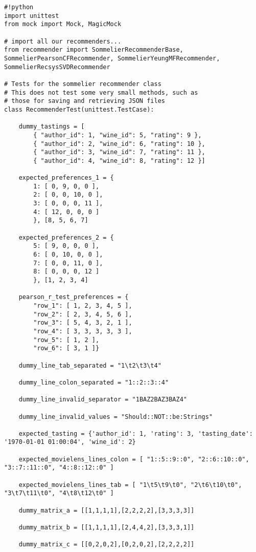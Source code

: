 \begin{verbatim}
#!python
import unittest
from mock import Mock, MagicMock

# import all our recommenders...
from recommender import SommelierRecommenderBase, SommelierPearsonCFRecommender, SommelierYeungMFRecommender, SommelierRecsysSVDRecommender

# Tests for the sommelier recommender class
# This does not test some very small methods, such as
# those for saving and retrieving JSON files
class RecommenderTest(unittest.TestCase):

    dummy_tastings = [
        { "author_id": 1, "wine_id": 5, "rating": 9 },
        { "author_id": 2, "wine_id": 6, "rating": 10 },
        { "author_id": 3, "wine_id": 7, "rating": 11 },
        { "author_id": 4, "wine_id": 8, "rating": 12 }]

    expected_preferences_1 = {
        1: [ 0, 9, 0, 0 ],
        2: [ 0, 0, 10, 0 ],
        3: [ 0, 0, 0, 11 ],
        4: [ 12, 0, 0, 0 ]
        }, [8, 5, 6, 7]

    expected_preferences_2 = {
        5: [ 9, 0, 0, 0 ],
        6: [ 0, 10, 0, 0 ],
        7: [ 0, 0, 11, 0 ],
        8: [ 0, 0, 0, 12 ]
        }, [1, 2, 3, 4]

    pearson_r_test_preferences = {
        "row_1": [ 1, 2, 3, 4, 5 ],
        "row_2": [ 2, 3, 4, 5, 6 ],
        "row_3": [ 5, 4, 3, 2, 1 ],
        "row_4": [ 3, 3, 3, 3, 3 ],
        "row_5": [ 1, 2 ],
        "row_6": [ 3, 1 ]}

    dummy_line_tab_separated = "1\t2\t3\t4"
    
    dummy_line_colon_separated = "1::2::3::4"

    dummy_line_invalid_separator = "1BAZ2BAZ3BAZ4"

    dummy_line_invalid_values = "Should::NOT::be:Strings"

    expected_tasting = {'author_id': 1, 'rating': 3, 'tasting_date': '1970-01-01 01:00:04', 'wine_id': 2}

    expected_movielens_lines_colon = [ "1::5::9::0", "2::6::10::0", "3::7::11::0", "4::8::12::0" ]

    expected_movielens_lines_tab = [ "1\t5\t9\t0", "2\t6\t10\t0", "3\t7\t11\t0", "4\t8\t12\t0" ]

    dummy_matrix_a = [[1,1,1,1],[2,2,2,2],[3,3,3,3]]

    dummy_matrix_b = [[1,1,1,1],[2,4,4,2],[3,3,3,1]]

    dummy_matrix_c = [[0,2,0,2],[0,2,0,2],[2,2,2,2]]


\end{verbatim}

